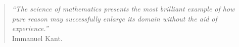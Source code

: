 
\begin{titlepage}
\thispagestyle{plain}

\bigskip
\bigskip
\vspace*{6cm}
\vfill
\hfill
\begin{minipage}{10cm}
\begin{quotation} 
\singlespacing 
\emph{``The science of mathematics presents the most brilliant example of 
how pure reason may successfully enlarge its domain without the aid of experience.''}\\ 
Immanuel Kant.
\end{quotation}
\end{minipage}
\vspace{1.5cm}



\end{titlepage}
